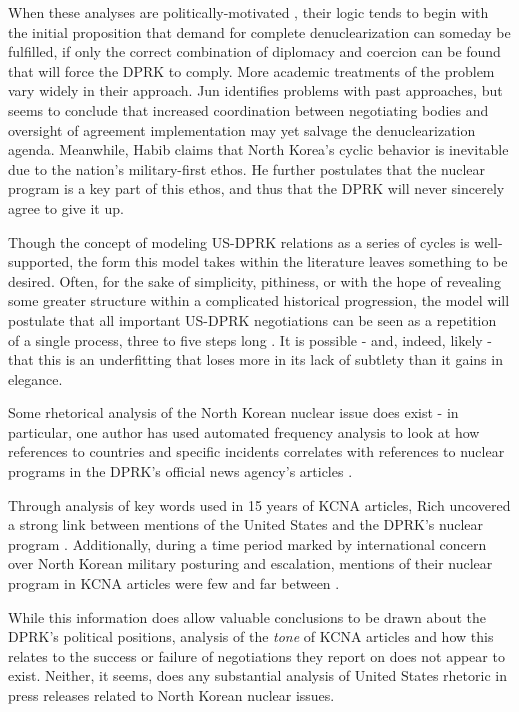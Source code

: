 \documentclass{article}
\begin{document}
When these analyses are politically-motivated \cite{blair, cfr}, their logic tends to begin with the initial proposition that demand for complete denuclearization can someday be fulfilled, if only the correct combination of diplomacy and coercion can be found that will force the DPRK to comply. More academic treatments of the problem \cite{habib,jun} vary widely in their approach. Jun \cite{jun} identifies problems with past approaches, but seems to conclude that increased coordination between negotiating bodies and oversight of agreement implementation may yet salvage the denuclearization agenda. Meanwhile, Habib \cite{habib} claims that North Korea’s cyclic behavior is inevitable due to the nation’s military-first ethos. He further postulates that the nuclear program is a key part of this ethos, and thus that the DPRK will never sincerely agree to give it up.

Though the concept of modeling US-DPRK relations as a series of cycles is well-supported, the form this model takes within the literature leaves something to be desired. Often, for the sake of simplicity, pithiness, or with the hope of revealing some greater structure within a complicated historical progression, the model will postulate that all important US-DPRK negotiations can be seen as a repetition of a single process, three to five steps long \cite{fisher,jun}. It is possible - and, indeed, likely - that this is an underfitting that loses more in its lack of subtlety than it gains in elegance.

Some rhetorical analysis of the North Korean nuclear issue does exist - in particular, one author has used automated frequency analysis to look at how references to countries and specific incidents correlates with references to nuclear programs in the DPRK’s official news agency's articles \cite{rich12,rich14}.

Through analysis of key words used in 15 years of KCNA articles, Rich uncovered a strong link between mentions of the United States and the DPRK’s nuclear program \cite{rich14}. Additionally, during a time period marked by international concern over North Korean military posturing and escalation, mentions of their nuclear program in KCNA articles were few and far between \cite{rich12}.


While this information does allow valuable conclusions to be drawn about the DPRK’s political positions, analysis of the \emph{tone} of KCNA articles and how this relates to the success or failure of negotiations they report on does not appear to exist. Neither, it seems, does any substantial analysis of United States rhetoric in press releases related to North Korean nuclear issues.
\end{document}
